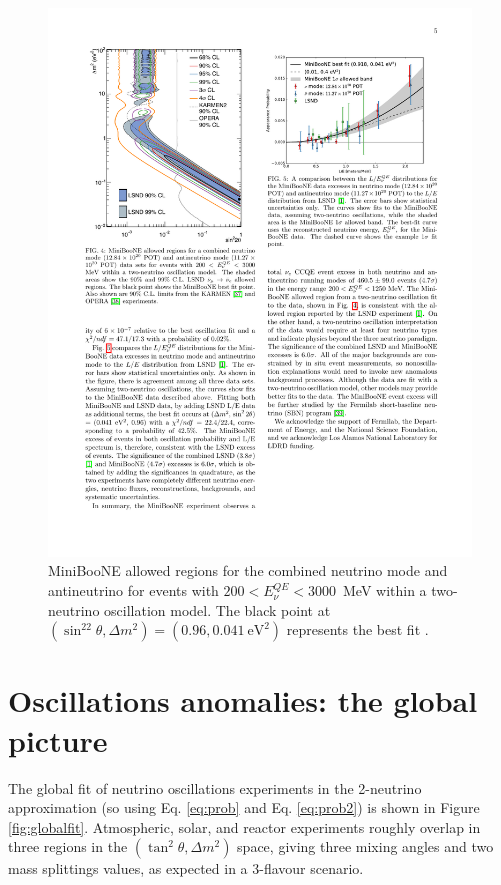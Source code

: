\begin{figure}[htbp]
    \centering
    \includegraphics[width=0.7\linewidth]{figures/miniboone_bestfit.pdf}
    \caption{MiniBooNE allowed regions for the combined neutrino mode and antineutrino for events with $200<E_{\nu}^{QE}<3000$~MeV within a two-neutrino oscillation model. The black point at $( \sin^22\theta, \Delta m^2)=(0.96, 0.041~\mathrm{eV^2})$ represents the best fit \cite{Aguilar-Arevalo:2018gpe}.}
    \label{fig:miniboone_bestfit}
\end{figure}


\section{Oscillations anomalies: the global picture}
The global fit of neutrino oscillations experiments in the 2-neutrino approximation (so using Eq. \ref{eq:prob} and Eq. \ref{eq:prob2}) is shown in Figure \ref{fig:globalfit}. Atmospheric, solar, and reactor experiments roughly overlap in three regions in the $(\tan^2\theta, \Delta m^2)$ space, giving three mixing angles and two mass splittings values, as expected in a 3-flavour scenario. 

